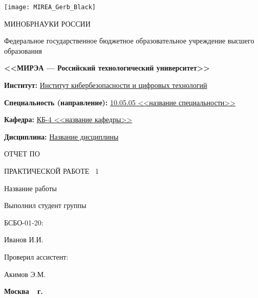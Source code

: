 \documentclass[14pt, a4paper, titlepage]{extarticle}
\begin{document}
\begin{titlepage}
    \pagestyle{empty}
    \setlength\parindent{0pt}
    \begin{center}
        \texttt{[image: MIREA\_Gerb\_Black]} \par
        МИНОБРНАУКИ РОССИИ \par 
        Федеральное государственное бюджетное образовательное учреждение высшего образования \par
        \textbf{<<МИРЭА --- Российский технологический университет>>}
    \end{center}
    \bigskip\par
    \textbf{Институт:} \uline{Институт кибербезопасности и цифровых технологий} \par
    \textbf{Специальность (направление):} \uline{10.05.05 <<название специальности>>} \par
    \textbf{Кафедра:} \uline{КБ-4 <<название кафедры>>} \par
    \textbf{Дисциплина:} \uline{Название дисциплины} \bigskip\par
    \begin{center}
        ОТЧЕТ ПО \par
        ПРАКТИЧЕСКОЙ РАБОТЕ \textnumero{}~1 \par
        Название работы
    \end{center}
    \begin{flushright}
        Выполнил студент группы \par
        БСБО-01-20: \par
        Иванов И.И. \par
        Проверил ассистент: \par
        Акимов Э.М.
    \end{flushright}
    \begin{center}
        \vfill \textbf{Москва~\the\year{}~г.}
    \end{center}
\end{titlepage}
\addtocounter{page}{1} %
\end{document}
